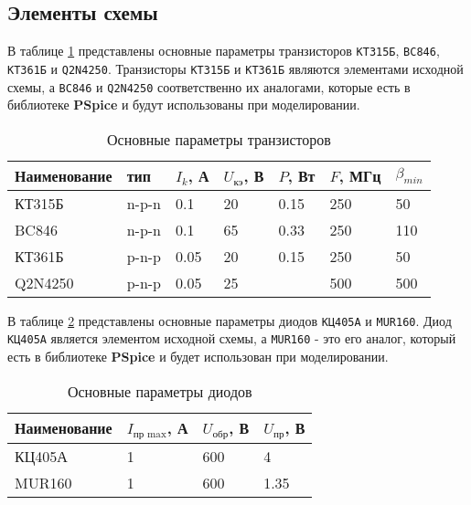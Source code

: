 \subsection{Элементы схемы}

В таблице \ref{tab:transistors} представлены основные параметры транзисторов \verb+КТ315Б+, \verb+BC846+, \verb+КТ361Б+ и \verb+Q2N4250+. Транзисторы \verb+КТ315Б+ и \verb+КТ361Б+ являются элементами исходной схемы, а \verb+BC846+ и \verb+Q2N4250+ соответственно их аналогами, которые есть в библиотеке \textbf{PSpice} и будут использованы при моделировании.

\begin{table}[H]
\begin{center}
	\caption{Основные параметры транзисторов}
	\label{tab:transistors}
	\def\tabcolsep{10pt}
	\begin{tabular}{|l|l|l|l|l|l|l|}
		\hline
		Наименование &
		тип & 
		$I_k$, А &
		$U_\text{кэ}$, В & 
		$P$, Вт & 
		$F$, МГц & 
		$\beta_{min}$ \\ 
		\hline
		КТ315Б &
		n-p-n &
		0.1 &
		20 &
		0.15 &
		250 &
		50 \\
		\hline
		BC846 &
		n-p-n &
		0.1 &
		65 &
		0.33 &
		250 &
		110 \\
		\hline
		КТ361Б &
		p-n-p &
		0.05 &
		20 &
		0.15 &
		250 &
		50 \\
		\hline
		Q2N4250 &
		p-n-p  &
		0.05 &
		25 &
		&
		500 &
		500 \\ 
		\hline
\end{tabular}
\end{center}
\end{table}

В таблице \ref{tab:diods} представлены основные параметры диодов \verb+КЦ405А+ и \verb+MUR160+. Диод \verb+КЦ405А+ является элементом исходной схемы, а \verb+MUR160+ - это его аналог, который есть в библиотеке \textbf{PSpice} и будет использован при моделировании.

\begin{table}[H]
\begin{center}
	\caption{Основные параметры диодов}
	\label{tab:diods}
	\def\tabcolsep{10pt}
	\begin{tabular}{|l|l|l|l|}
		\hline
		Наименование &
		$I_\text{пр max}$, А &
		$U_\text{обр}$, В &
		$U_\text{пр}$, В \\ 
		\hline
		КЦ405А &
		1 &
		600 &
		4 \\
		\hline
		MUR160 &
		1 &
		600 &
		1.35 \\
		\hline
\end{tabular}
\end{center}
\end{table}

